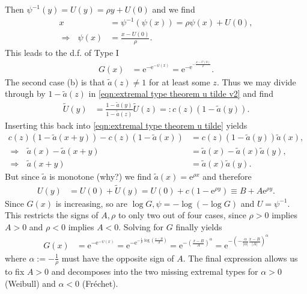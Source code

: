 \documentclass[english, parskip=full]{scrartcl}
\newcommand{\kla}{}
\newcommand{\e}{\text{e}}
\begin{document}
Then $\psi^{-1}(y) = U(y) = \rho y + U(0)$ and we find
\begin{align}
x &= \psi^{-1}(\psi(x)) = \rho \psi(x) + U(0),\\
\Rightarrow\ \ \ \psi(x) &= \frac{x - U(0)}{\rho}.
\end{align}
This leads to the d.f. of Type I
\begin{align}
G(x) &= \e^{-\e^{-\psi(x)}} = \e^{-\e^{-\frac{x - U(0)}{\rho}}}.
\end{align}
The second case (b) is that $\tilde{a}(z) \neq 1$ for at least some $z$.
Thus we may divide through by $1 - \tilde{a}(z)$ in \autoref{eqn:extremal type theorem u tilde v2} and find
\begin{align}
\tilde{U}(y) &= \frac{1 - \tilde{a}(y)}{1 - \tilde{a}(z)}\tilde{U}(z) =: c(z) \kla\left( 1 - \tilde{a}(y) \right).
\end{align}
Inserting this back into \autoref{eqn:extremal type theorem u tilde} yields
\begin{align}
c(z) \kla\left( 1 - \tilde{a}(x+y) \right) - c(z) \kla\left( 1 - \tilde{a}(x) \right) &= c(z) \kla\left( 1 - \tilde{a}(y) \right) \tilde{a}(x),\\
\Rightarrow\ \ \ \tilde{a}(x) - \tilde{a}(x+y) &= \tilde{a}(x) - \tilde{a}(x) \tilde{a}(y),\\
\Rightarrow\ \ \ \tilde{a}(x+y) &= \tilde{a}(x) \tilde{a}(y).
\end{align}
But since $\tilde{a}$ is monotone (why?) we find $\tilde{a}(x) = \e^{\rho x}$ and therefore
\begin{align}
U(y) &= U(0) + \tilde{U}(y) = U(0) + c \kla\left( 1 - \e^{\rho y} \right) \equiv B + A\e^{\rho y}.
\end{align}
Since $G(x)$ is increasing, so are $\log G, \psi = -\log (-\log G)$ and $U = \psi^{-1}$.
This restricts the signs of $A,\rho$ to only two out of four cases, since $\rho > 0$ implies $A>0$ and $\rho < 0$ implies $A<0$.
Solving for $G$ finally yields
\begin{align}
G(x) &= \e^{-\e^{-\psi(x)}} = \e^{-\e^{-\frac{1}{\rho} \log \left( \frac{x - B}{A} \right)}} = \e^{-\kla\left( \frac{x - B}{A} \right)^\alpha} = \e^{-\kla\left( -\frac{\alpha}{|\alpha|} \frac{x - B}{|A|} \right)^\alpha}
\end{align}
where $\alpha := -\frac{1}{\rho}$ must have the opposite sign of $A$.
The final expression allows us to fix $A>0$ and decomposes into the two missing extremal types for $\alpha > 0$ (Weibull) and $\alpha < 0$ (Fr\'echet).


\end{document}
